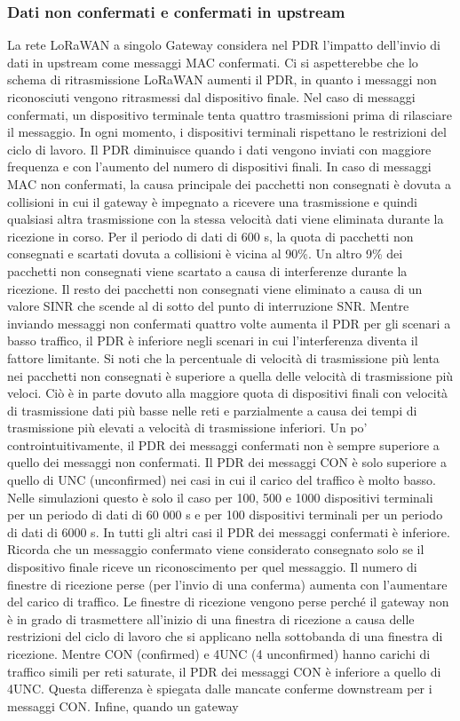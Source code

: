\documentclass[a4paper]{report} %
\begin{document}
\subsubsection{Dati non confermati e confermati in upstream}
La rete LoRaWAN a singolo Gateway considera nel PDR l'impatto dell'invio di dati in upstream come messaggi MAC confermati. Ci si aspetterebbe che lo schema di ritrasmissione LoRaWAN aumenti il PDR, in quanto i messaggi non riconosciuti vengono ritrasmessi dal dispositivo finale. Nel caso di messaggi confermati, un dispositivo terminale tenta quattro trasmissioni prima di rilasciare il messaggio. In ogni momento, i dispositivi terminali rispettano le restrizioni del ciclo di lavoro. Il PDR diminuisce quando i dati vengono inviati con maggiore frequenza e con l'aumento del numero di dispositivi finali. In caso di messaggi MAC non confermati, la causa principale dei pacchetti non consegnati è dovuta a collisioni in cui il gateway è impegnato a ricevere una trasmissione e quindi qualsiasi altra trasmissione con la stessa velocità dati viene eliminata durante la ricezione in corso. Per il periodo di dati di 600 s, la quota di pacchetti non consegnati e scartati dovuta a collisioni è vicina al 90\%. Un altro 9\% dei pacchetti non consegnati viene scartato a causa di interferenze durante la ricezione. Il resto dei pacchetti non consegnati viene eliminato a causa di un valore SINR che scende al di sotto del punto di interruzione SNR. Mentre inviando messaggi non confermati quattro volte aumenta il PDR per gli scenari a basso traffico, il PDR è inferiore negli scenari in cui l'interferenza diventa il fattore limitante. Si noti che la percentuale di velocità di trasmissione più lenta nei pacchetti non consegnati è superiore a quella delle velocità di trasmissione più veloci. Ciò è in parte dovuto alla maggiore quota di dispositivi finali con velocità di trasmissione dati più basse nelle reti e parzialmente a causa dei tempi di trasmissione più elevati a velocità di trasmissione inferiori. Un po' controintuitivamente, il PDR dei messaggi confermati non è sempre superiore a quello dei messaggi non confermati. Il PDR dei messaggi CON è solo superiore a quello di UNC (unconfirmed) nei casi in cui il carico del traffico è molto basso. Nelle simulazioni questo è solo il caso per 100, 500 e 1000 dispositivi terminali per un periodo di dati di 60 000 s e per 100 dispositivi terminali per un periodo di dati di 6000 s. In tutti gli altri casi il PDR dei messaggi confermati è inferiore. Ricorda che un messaggio confermato viene considerato consegnato solo se il dispositivo finale riceve un riconoscimento per quel messaggio. Il numero di finestre di ricezione perse (per l'invio di una conferma) aumenta con l'aumentare del carico di traffico. Le finestre di ricezione vengono perse perché il gateway non è in grado di trasmettere all'inizio di una finestra di ricezione a causa delle restrizioni del ciclo di lavoro che si applicano nella sottobanda di una finestra di ricezione. Mentre CON (confirmed) e 4UNC (4 unconfirmed) hanno carichi di traffico simili per reti saturate, il PDR dei messaggi CON è inferiore a quello di 4UNC. Questa differenza è spiegata dalle mancate conferme downstream per i messaggi CON. Infine, quando un gateway 
\end{document}
